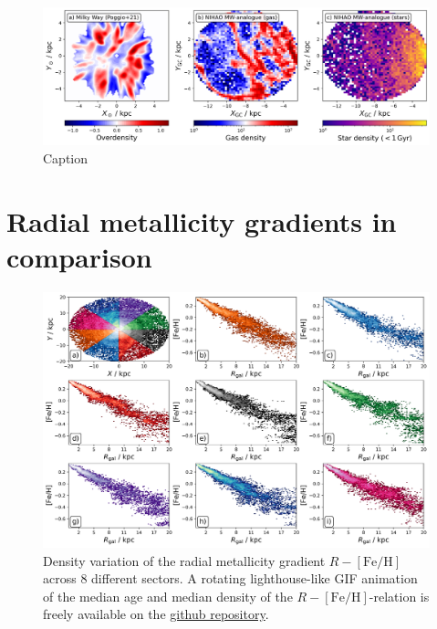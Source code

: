 \documentclass[fleqn,usenatbib]{mnras}
\begin{document}
\begin{figure}
    \centering
    \includegraphics[width=\textwidth]{figures/overdensities_mw_vs_nihao.png}
    \caption{Caption}
    \label{fig:overdensities_mw_vs_nihao}
\end{figure}

\section{Radial metallicity gradients in comparison}
\label{sec:radial_metallicity_gradient_comparison}

\begin{figure}
    \centering
    \includegraphics[width=\textwidth]{figures/radial_metallicity_gradients_mw_in_angles.png}
    \caption{Density variation of the radial metallicity gradient $R-\mathrm{[Fe/H]}$ across 8 different sectors. A rotating lighthouse-like GIF animation of the median age and median density of the $R-\mathrm{[Fe/H]}$-relation is freely available on the \href{https://github.com/svenbuder/nihao_radial_metallicity_gradients/blob/main/figures/xyz_rfeh.gif}{github repository}.}
    \label{fig:radial_metallicity_gradients_mw_in_angles}
\end{figure}
\end{document}
